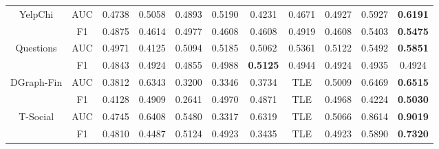 \begin{table}[h]
{\begin{tabular}{cc|ccccccccc}
\multirow{2}{*}{YelpChi}    & AUC     & 0.4738          & 0.5058 & 0.4893 & 0.5190    & 0.4231          & 0.4671 & 0.4927   & 0.5927          & \textbf{0.6191} \\
                            & F1      & 0.4875          & 0.4614 & 0.4977 & 0.4608    & 0.4608          & 0.4919 & 0.4608   & 0.5403          & \textbf{0.5475} \\ \hline
\multirow{2}{*}{Questions}  & AUC     & 0.4971          & 0.4125 & 0.5094 & 0.5185    & 0.5062          & 0.5361 & 0.5122   & 0.5492          & \textbf{0.5851} \\
                            & F1      & 0.4843          & 0.4924 & 0.4855 & 0.4988    & \textbf{0.5125} & 0.4944 & 0.4924   & 0.4935          & 0.4924          \\ \hline
\multirow{2}{*}{DGraph-Fin} & AUC     & 0.3812          & 0.6343 & 0.3200 & 0.3346    & 0.3734          & TLE    & 0.5009   & 0.6469          & \textbf{0.6515} \\
                            & F1      & 0.4128          & 0.4909 & 0.2641 & 0.4970    & 0.4871          & TLE    & 0.4968   & 0.4224          & \textbf{0.5030} \\ \hline
\multirow{2}{*}{T-Social}   & AUC     & 0.4745          & 0.6408 & 0.5480 & 0.3317    & 0.6319          & TLE    & 0.5066   & 0.8614          & \textbf{0.9019} \\
                            & F1      & 0.4810          & 0.4487 & 0.5124 & 0.4923    & 0.3435          & TLE    & 0.4923   & 0.5890          & \textbf{0.7320} \\ \hline \hline
\end{tabular}
}\vspace{-4mm}
\end{table}